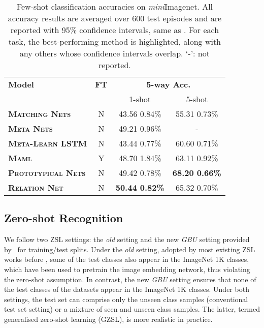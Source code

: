 \documentclass[10pt,twocolumn,letterpaper]{article}
\begin{document}
\setlength{\tabcolsep}{4.8pt}
\begin{table}[t]
\centering
\footnotesize
\begin{tabular}{@{} lccc @{}}
\toprule
\multirow{2}{*}{\bf Model} & \multirow{2}{*}{\bf FT} &\multicolumn{2}{c}{\multirow{2}{*}{\bf 5-way Acc.}}\\
& \multicolumn{2}{c}{}  \\
& & 1-shot & 5-shot \\
\midrule 

\textbf{\textsc{Matching} \textsc{Nets}} \cite{vinyals2016matching}& N &43.56  0.84\% &55.31  0.73\%  \\ 
\textbf{\textsc{Meta} \textsc{Nets}} \cite{munkhdalai2017meta}& N &49.21  0.96\% & - \\ 
\textbf{\textsc{Meta}-\textsc{Learn} \textsc{LSTM}} \cite{ravi2016optimization}& N &43.44  0.77\% & 60.60  0.71\% \\ 
\textbf{\textsc{Maml}} \cite{finn2017model}& Y& 48.70  1.84\% & 63.11  0.92\% \\ 
\textbf{\textsc{Prototypical} \textsc{Nets}} \cite{snell2017prototypical}&N  &49.42  0.78\% &\textbf{68.20  0.66\%}  \\ 
\midrule
\textbf{\textsc{Relation} \textsc{Net}}&N& \textbf{50.44  0.82\%} &65.32  0.70\% \\ 
\bottomrule
\end{tabular}\caption{\small
Few-shot classification accuracies on \textit{mini}Imagenet. All accuracy results are averaged over 600 test episodes and are reported with 95\% confidence intervals, same as \cite{snell2017prototypical}. For each task, the best-performing method is highlighted, along with any others whose confidence intervals overlap. `-': not reported.
}
\label{tab:mini}
\end{table}
 











\subsection{Zero-shot Recognition}
We follow two ZSL settings: the \emph{old} setting and the new \emph{GBU} setting provided by~\cite{xian2017zero} for training/test splits. 
Under the \emph{old} setting, adopted by most existing ZSL works before \cite{xian2017zero}, some of the test classes also appear in
the ImageNet 1K classes, which have been used to pretrain the image embedding 
network, thus violating the zero-shot assumption.
In contrast, the new \emph{GBU} setting ensures that none of the test classes of the datasets appear in
the ImageNet 1K classes. Under both settings, the test set can comprise only the unseen class samples (conventional test set setting) or a mixture of seen and unseen class samples. The latter, termed   generalised zero-shot learning (GZSL), is more realistic in practice.  
\end{document}
